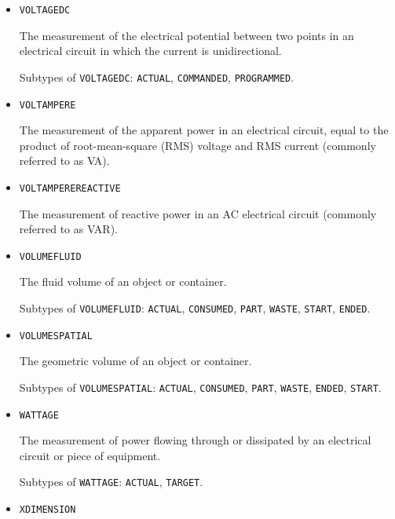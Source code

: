 \begin{itemize}
The measurement of the electrical potential between two points in an electrical circuit in which the current periodically reverses direction.

Subtypes of \texttt{VOLTAGE\textunderscore AC}: \texttt{ACTUAL}, \texttt{COMMANDED}, \texttt{PROGRAMMED}.

\item \texttt{VOLTAGE\textunderscore DC}  

The measurement of the electrical potential between two points in an electrical circuit in which the current is unidirectional.

Subtypes of \texttt{VOLTAGE\textunderscore DC}: \texttt{ACTUAL}, \texttt{COMMANDED}, \texttt{PROGRAMMED}.

\item \texttt{VOLT\textunderscore AMPERE}  

The measurement of the apparent power in an electrical circuit, equal to the product of root-mean-square (RMS) voltage and RMS current (commonly referred to as VA).


\item \texttt{VOLT\textunderscore AMPERE\textunderscore REACTIVE}  

The measurement of reactive power in an AC electrical circuit (commonly referred to as VAR).


\item \texttt{VOLUME\textunderscore FLUID}  

The fluid volume of an object or container.

Subtypes of \texttt{VOLUME\textunderscore FLUID}: \texttt{ACTUAL}, \texttt{CONSUMED}, \texttt{PART}, \texttt{WASTE}, \texttt{START}, \texttt{ENDED}.

\item \texttt{VOLUME\textunderscore SPATIAL}  

The geometric volume of an object or container.

Subtypes of \texttt{VOLUME\textunderscore SPATIAL}: \texttt{ACTUAL}, \texttt{CONSUMED}, \texttt{PART}, \texttt{WASTE}, \texttt{ENDED}, \texttt{START}.

\item \texttt{WATTAGE}  

The measurement of power flowing through or dissipated by an electrical circuit or piece of equipment.

Subtypes of \texttt{WATTAGE}: \texttt{ACTUAL}, \texttt{TARGET}.

\item \texttt{X\textunderscore DIMENSION}  


\end{itemize}

